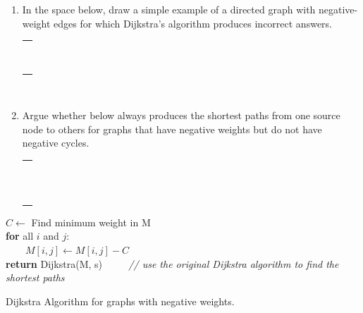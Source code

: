\documentclass[11pt]{article}
\begin{document}
\begin{enumerate}
\begin{enumerate}[label=(\alph*)]
        \newpage
        \item In the space below, draw a simple example of a directed graph with negative-weight edges for which Dijkstra's algorithm produces incorrect answers.\vspace{0.2cm}\\
         \begin{tabular}{ | m{14cm} | } 
         \hline
         \\ \\ \\ \\ \\ \\ \\ \\ \\
         \hline
        \end{tabular} \\
        
        \item Argue whether  below always produces the shortest paths from one source node to others for graphs that have negative weights but do not have negative cycles.\vspace{0.2cm}
        \\
         \begin{tabular}{ | m{14cm} | } 
         \hline
         \\ \\ \\ \\ \\ \\ \\  \\ \\ \\ \\ \\
         \hline
        \end{tabular}
    \end{enumerate}
    \begin{algorithm}[H]
    
        $C \leftarrow$ Find minimum weight in M\\
        \textbf{for} all $i$ and $j$:\\
              $\qquad M[i,j] \leftarrow M[i,j]-C$ \\
        \textbf{return} Dijkstra(M, s)   $\qquad$ \textit{\small// use the original Dijkstra algorithm to find the shortest paths} 
        \caption{Dijkstra Algorithm for graphs with negative weights.}
    \end{algorithm}
    

\end{enumerate}
\end{document}
